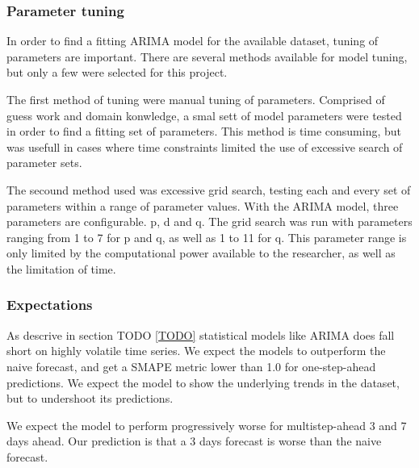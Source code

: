 \subsubsection{Parameter tuning}
\label{section:Method:Arima:Tuning}
In order to find a fitting ARIMA model for the available dataset, tuning of parameters are important.
There are several methods available for model tuning, but only a few were selected for this project.

The first method of tuning were manual tuning of parameters.
Comprised of guess work and domain konwledge, a smal sett of model parameters were tested in order to find a fitting set of parameters.
This method is time consuming, but was usefull in cases where time constraints limited the use of excessive search of parameter sets.

The secound method used was excessive grid search, testing each and every set of parameters within a range of parameter values.
With the ARIMA model, three parameters are configurable. p, d and q.
The grid search was run with parameters ranging from 1 to 7 for p and q, as well as 1 to 11 for q.
This parameter range is only limited by the computational power available to the researcher, as well as the limitation of time.


\subsubsection{Expectations}
As descrive in section TODO \cref{TODO} statistical models like ARIMA does
fall short on highly volatile time series.
We expect the models to outperform the naive forecast, and get a SMAPE metric
lower than 1.0 for one-step-ahead predictions.
We expect the model to show the underlying trends in the dataset, but to
undershoot its predictions.

We expect the model to perform progressively worse for multistep-ahead 3 and 7
days ahead. Our prediction is that a 3 days forecast is worse than the naive forecast.



